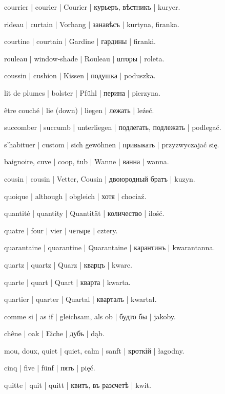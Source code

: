 \begin{outdent}{1em}
courrier | courier | Courier | курьеръ, вѣстникъ | kuryer.

rideau | curtain | Vorhang | занавѣсъ | kurtyna, firanka.

\uvsubentry{}
courtine | courtain | Gardine | гардины | firanki.

\uvsubentry{}
rouleau | window-shade | Rouleau | шторы | roleta.

coussin | cushion | Kissen | подушка | poduszka.

\uvsubentry{}
lit de plumes | bolster | Pfühl | перина | pierzyna.

être couché | lie (down) | liegen | лежать | leźeć.

\uvsubentry{}
succomber | succumb | unterliegen | подлегать, подлежать | podlegać.

s’habituer | custom | sich gewöhnen | привыкать | przyzwyczajać się.

baignoire, cuve | coop, tub | Wanne | ванна | wanna.

cousin | cousin | Vetter, Cousin | двоюродный братъ | kuzyn.

quoique | although | obgleich | хотя | chociaź.

quantité | quantity | Quantität | количество | ilość.

quatre | four | vier | четыре | cztery.

quarantaine | quarantine | Quarantaine | карантинъ | kwarantanna.

quartz | quartz | Quarz | кварцъ | kwarc.

quarte | quart | Quart | кварта | kwarta.

quartier | quarter | Quartal | кварталъ | kwartał.

comme si | as if | gleichsam, als ob | будто бы | jakoby.

chêne | oak | Eiche | дубъ | dąb.

mou, doux, quiet | quiet, calm | sanft | кроткій | łagodny.

cinq | five | fünf | пять | pięć.

quitte | quit | quitt | квитъ, въ разсчетѣ | kwit.


\end{outdent}
